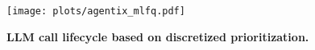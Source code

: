 \begin{figure}[t]
    \centering
    \texttt{[image: plots/agentix\_mlfq.pdf]}
    \caption{\small\textbf{LLM call lifecycle based on discretized prioritization.}}
    \label{fig:agentix_mlfq}
     \vspace{-3mm}
 \end{figure}